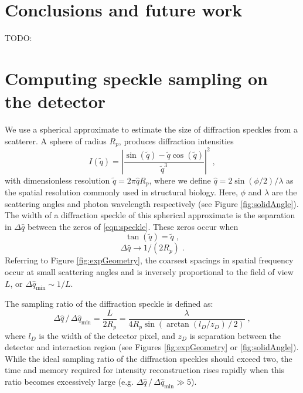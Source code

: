 \documentclass[preprint]{iucr}              %
\begin{document}
\section{Conclusions and future work}

TODO:


\appendix

\section{Computing speckle sampling on the detector}\label{sec:speckle}
We use a spherical approximate to estimate the size of diffraction speckles from a scatterer. A sphere of radius $R_p$, produces diffraction intensities 
\begin{equation}
I(\widetilde{q}) = \left|\frac{\sin(\widetilde{q}) - \widetilde{q} \cos(\widetilde{q})} {\widetilde{q}^3} \right|^2 \;, \label{eqn:speckle}
\end{equation}
with dimensionless resolution $\widetilde{q} = 2 \pi \widehat{q} R_p$, where we define $\widehat{q} = 2 \sin(\phi/2) / \lambda$ as the spatial resolution commonly used in structural biology. Here, $\phi$ and $\lambda$ are the scattering angles and photon wavelength respectively (see Figure \ref{fig:solidAngle}). The width of a diffraction speckle of this spherical approximate is the separation in $\Delta \widehat{q} $ between the zeros of \eqref{eqn:speckle}. These zeros occur when 
\begin{equation}
\tan(\widetilde{q}) = \widetilde{q} \;,
\end{equation}
\begin{equation}
\Delta \widehat{q} \to 1/(2 R_p) \;. 
\end{equation}
Referring to Figure \ref{fig:expGeometry}, the coarsest spacings in spatial frequency occur at small scattering angles and is inversely proportional to the field of view $L$, or $\Delta \widehat{q}_{\text{min}} \sim 1/L$. 

The sampling ratio of the diffraction speckle is defined as:
\begin{equation}
\Delta \widehat{q} \,/\, \Delta \widehat{q}_{\text{min}} = \frac{L}{2R_p} = \frac{\lambda}{4 R_p \sin\left( \arctan (l_D / z_D) \,/\,2 \right)}\; ,
\end{equation}
where $l_D$ is the width of the detector pixel, and $z_D$ is separation between the detector and interaction region (see Figures \ref{fig:expGeometry} or \ref{fig:solidAngle}). While the ideal sampling ratio of the diffraction speckles should exceed two, the time and memory required for intensity reconstruction rises rapidly when this ratio becomes excessively large (e.g. $ \Delta \widehat{q} \,/\, \Delta \widehat{q}_{\text{min}} \gg 5$). 
\end{document}
